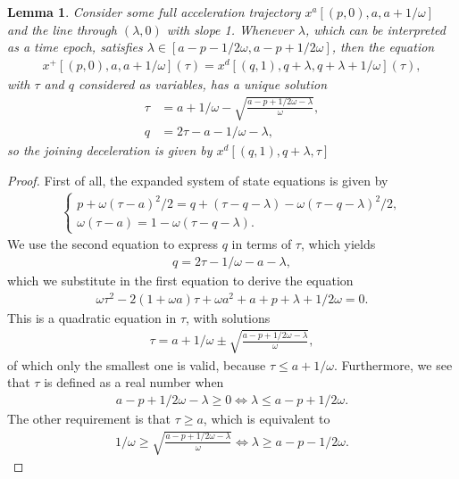 \documentclass[a4paper]{article}
\theoremstyle{definition}
\theoremstyle{plain}
\newtheorem{lemma}{Lemma\hspace{0.25em}\ignorespaces}
\begin{document}
\begin{lemma}
  \label{lemma:line_acc}
  Consider some full acceleration trajectory $x^{a}[(p, 0), a, a+1/\omega]$ and the
  line through $(\lambda, 0)$ with slope 1. Whenever $\lambda$, which can be
  interpreted as a time epoch, satisfies $\lambda \in [a-p-1/2\omega, a-p+1/2\omega]$, then the equation
  \begin{align*}
    x^{+}[(p, 0), a, a+1/\omega](\tau) = x^{d}[(q, 1), q + \lambda, q + \lambda + 1/\omega](\tau) ,
  \end{align*}
  with $\tau$ and $q$ considered as variables, has a unique solution
  \begin{align*}
    \tau &= a + 1/\omega - \sqrt{\frac{a - p + 1/2\omega - \lambda}{\omega}} , \\
    q &= 2\tau - a - 1/\omega - \lambda ,
  \end{align*}
  so the joining deceleration is given by $x^{d}[(q,1), q + \lambda, \tau]$
\end{lemma}
\begin{proof}
  First of all, the expanded system of state equations is given by
  \begin{align*}
    \begin{cases}
    p + \omega (\tau - a)^{2}/2 = q + (\tau - q - \lambda) - \omega (\tau - q - \lambda)^{2}/2 , \\
    \omega(\tau - a) = 1 - \omega(\tau - q - \lambda) .
      \end{cases}
  \end{align*}
  We use the second equation to express $q$ in terms of $\tau$, which yields
  \begin{align*}
    q = 2\tau - 1/\omega -a - \lambda ,
  \end{align*}
  which we substitute in the first equation to derive the equation
  \begin{align*}
    \omega \tau^{2}  - 2 (1 + \omega a) \tau + \omega a^{2} + a + p + \lambda + 1/2\omega = 0 .
  \end{align*}
  This is a quadratic equation in $\tau$, with solutions
  \begin{align*}
    \tau = a + 1/\omega \pm \sqrt{\frac{a - p + 1/2\omega - \lambda}{\omega}} ,
  \end{align*}
  of which only the smallest one is valid, because $\tau \leq a + 1/\omega$.
  Furthermore, we see that $\tau$ is defined as a real number when
  \begin{align*}
    a - p + 1/2\omega - \lambda \geq 0 \iff \lambda \leq a - p + 1/2\omega .
  \end{align*}
  The other requirement is that $\tau \geq a$, which is equivalent to
  \begin{align*}
    1/\omega \geq \sqrt{\frac{a - p + 1/2\omega - \lambda}{\omega}} \iff
    \lambda \geq a - p - 1/2\omega .
  \end{align*}
\end{proof}
\end{document}

